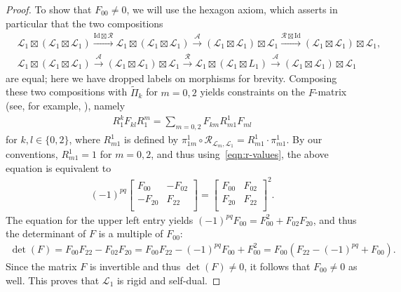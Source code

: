 \documentclass[pdftex]{sigma}
\numberwithin{equation}{section}
\theoremstyle{definition}
\begin{document}
\begin{proof}
To show that $F_{00}\neq 0$, we will use the hexagon axiom, which asserts in particular that the two compositions
\begin{align*}
& \mathcal{L}_1\boxtimes(\mathcal{L}_1\boxtimes\mathcal{L}_1)\xrightarrow{\mathrm{Id}\boxtimes\mathcal{R}} \mathcal{L}_1\boxtimes(\mathcal{L}_1\boxtimes\mathcal{L}_1)\xrightarrow{\mathcal{A}} (\mathcal{L}_1\boxtimes\mathcal{L}_1)\boxtimes\mathcal{L}_1\xrightarrow{\mathcal{R}\boxtimes\mathrm{Id}} (\mathcal{L}_1\boxtimes\mathcal{L}_1)\boxtimes\mathcal{L}_1,\\
& \mathcal{L}_1\boxtimes(\mathcal{L}_1\boxtimes\mathcal{L}_1)\xrightarrow{\mathcal{A}} (\mathcal{L}_1\boxtimes\mathcal{L}_1)\boxtimes\mathcal{L}_1\xrightarrow{\mathcal{R}} \mathcal{L}_1\boxtimes(\mathcal{L}_1\boxtimes{L}_1)\xrightarrow{\mathcal{A}} (\mathcal{L}_1\boxtimes\mathcal{L}_1)\boxtimes\mathcal{L}_1
\end{align*}
are equal; here we have dropped labels on morphisms for brevity. Composing these two compositions with $\widetilde{\Pi}_k$ for $m=0,2$ yields constraints on the $F$-matrix (see, for example, \cite[equation~2.3]{Aboum}), namely
\begin{gather*}
R_1^k F_{kl} R_1^m = \sum_{m=0,2} F_{km} R_{m1}^1 F_{ml}
\end{gather*}
for $k,l\in\lbrace 0,2\rbrace$,
where $R_{m1}^1$ is defined by $\pi_{1m}^1\circ\mathcal{R}_{\mathcal{L}_m,\mathcal{L}_1}=R_{m1}^1\cdot\pi_{m1}^1$. By our conventions, $R_{m1}^1=1$ for $m=0,2$, and thus using~\eqref{eqn:r-values}, the above equation is equivalent to
\begin{gather}\label{eqn:hex-contraint}
(-1)^{pq}\left[\begin{matrix}
F_{00} & -F_{02}\\
-F_{20} & F_{22}\\
\end{matrix}\right] = \left[\begin{matrix}
F_{00} & F_{02}\\
F_{20} & F_{22}\\
\end{matrix}\right]^2.
\end{gather}
The equation for the upper left entry yields
$
(-1)^{pq}F_{00} = F_{00}^2 + F_{02}F_{20}$,
and thus the determinant of $F$ is a multiple of $F_{00}$:
\begin{align*}
\det(F) = F_{00}F_{22}-F_{02}F_{20} = F_{00}F_{22}-(-1)^{pq}F_{00}+F_{00}^2 = F_{00}(F_{22}-(-1)^{pq}+F_{00}).
\end{align*}
Since the matrix $F$ is invertible and thus $\det(F)\neq 0$, it follows that $F_{00}\neq 0$ as well. This proves that $\mathcal{L}_1$ is rigid and self-dual.


\end{proof}
\end{document}
